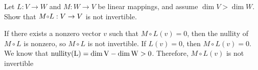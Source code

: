 \documentclass{ximera}
\begin{document}
\begin{exercise} \label{c7.3.3}
Let $L:V\to W$ and $M:W\to V$ be linear mappings, and assume $\dim V > \dim W$.
Show that $M\compose L:V\to V$ is not invertible.

\begin{solution}

If there exists a nonzero vector $v$ such that $M\circ L(v) = 0$,
then the nullity of $M \circ L$ is nonzero, so $M \circ L$ is not
invertible.  If $L(v) = 0$, then $M \circ L(v) = 0$.  We know that
$\rm{nullity}(L) = \dim V - \dim W > 0$.  Therefore, $M\circ L(v)$
is not invertible

\end{solution}
\end{exercise}
\end{document}

